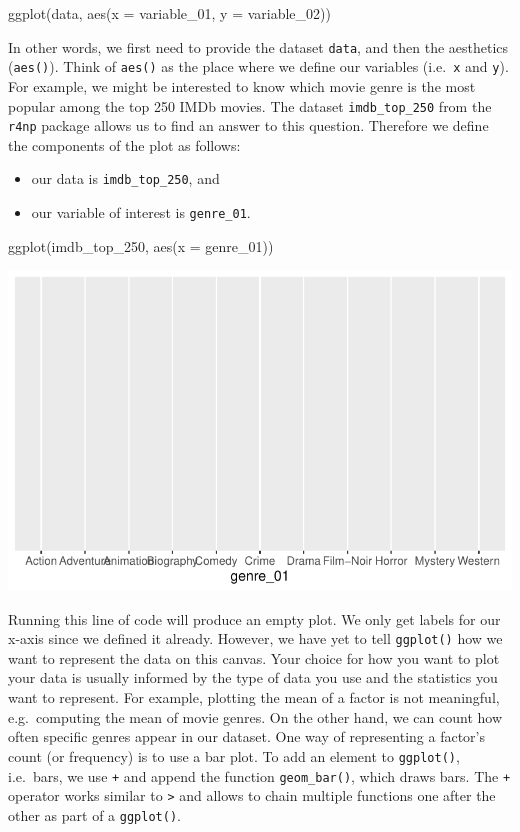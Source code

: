 \documentclass[
  letterpaper,
]{krantz}
\makeatletter
\newenvironment{Shaded}{\begin{snugshade}}{\end{snugshade}}
\newcommand{\AttributeTok}[1]{\textcolor[rgb]{0.40,0.45,0.13}{#1}}
\newcommand{\FunctionTok}[1]{\textcolor[rgb]{0.28,0.35,0.67}{#1}}
\newcommand{\NormalTok}[1]{\textcolor[rgb]{0.00,0.23,0.31}{#1}}
\newenvironment{kframe}{%
\medskip{}
\setlength{\fboxsep}{.8em}
 \def\at@end@of@kframe{}%
 \ifinner\ifhmode%
  \def\at@end@of@kframe{\end{minipage}}%
  \begin{minipage}{\columnwidth}%
 \fi\fi%
 \def\FrameCommand##1{\hskip\@totalleftmargin \hskip-\fboxsep
 \colorbox{shadecolor}{##1}\hskip-\fboxsep
     \hskip-\linewidth \hskip-\@totalleftmargin \hskip\columnwidth}%
 \MakeFramed {\advance\hsize-\width
   \@totalleftmargin\z@ \linewidth\hsize
   \@setminipage}}%
 {\par\unskip\endMakeFramed%
 \at@end@of@kframe}
\renewenvironment{Shaded}{\begin{kframe}}{\end{kframe}}
\makeatother
\begin{document}
\label{basic_ggplot_structure}
ggplot(data, aes(x = variable\_01, y = variable\_02))

In other words, we first need to provide the dataset \texttt{data}, and
then the aesthetics (\texttt{aes()}). Think of \texttt{aes()} as the
place where we define our variables (i.e.~\texttt{x} and \texttt{y}).
For example, we might be interested to know which movie genre is the
most popular among the top 250 IMDb movies. The dataset
\texttt{imdb\_top\_250} from the \texttt{r4np} package allows us to find
an answer to this question. Therefore we define the components of the
plot as follows:

\begin{itemize}
\item
  our data is \texttt{imdb\_top\_250}, and
\item
  our variable of interest is \texttt{genre\_01}.
\end{itemize}

\begin{Shaded}
\begin{Highlighting}[]
\FunctionTok{ggplot}\NormalTok{(imdb\_top\_250, }\FunctionTok{aes}\NormalTok{(}\AttributeTok{x =}\NormalTok{ genre\_01))}
\end{Highlighting}
\end{Shaded}

\includegraphics{08_descriptive_statistics_files/figure-pdf/most-popular-genre-incomplete-plot-1.pdf}

Running this line of code will produce an empty plot. We only get labels
for our x-axis since we defined it already. However, we have yet to tell
\texttt{ggplot()} how we want to represent the data on this canvas. Your
choice for how you want to plot your data is usually informed by the
type of data you use and the statistics you want to represent. For
example, plotting the mean of a factor is not meaningful, e.g.~computing
the mean of movie genres. On the other hand, we can count how often
specific genres appear in our dataset. One way of representing a
factor's count (or frequency) is to use a bar plot. To add an element to
\texttt{ggplot()}, i.e.~bars, we use \texttt{+} and append the function
\texttt{geom\_bar()}, which draws bars. The \texttt{+} operator works
similar to \texttt{\textbar{}\textgreater{}} and allows to chain
multiple functions one after the other as part of a \texttt{ggplot()}.
\end{document}
